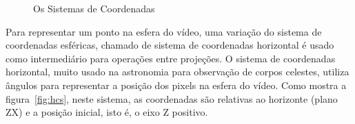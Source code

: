 \begin{figure}[htbp]
\centering

 \quad
{} \quad
{} \quad

\caption{Os Sistemas de Coordenadas}
\label{fig:coord_sis}
\end{figure}

Para representar um ponto na esfera do vídeo, uma variação do sistema de coordenadas esféricas, chamado de sistema de coordenadas horizontal é usado como intermediário para operações entre projeções. O sistema de coordenadas horizontal, muito usado na astronomia para observação de corpos celestes, utiliza ângulos para representar a posição dos pixels na esfera do vídeo. Como mostra a figura~\ref{fig:hcs}, neste sistema, as coordenadas são relativas ao horizonte (plano ZX) e a posição inicial, isto é, o eixo Z positivo. 


